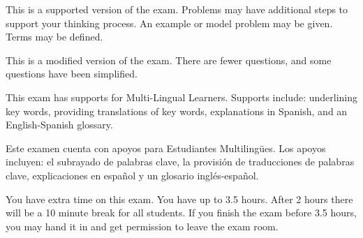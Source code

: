 \documentclass[12pt]{exam}
\begin{document}
\begin{coverpages}
{}{
    This is a supported version of the exam. Problems may have additional steps to support your thinking process. An example or model problem may be given. Terms may be defined. 
    
        \ifESP{ %
            \textcolor{blue!80!black}{
            Esta es una versión del examen con apoyos. Los problemas pueden tener pasos adicionales para apoyar su proceso de pensamiento. Se puede proporcionar un ejemplo o un problema modelo. Los términos pueden estar definidos.
            }
        }{}
}{
    This is a modified version of the exam. There are fewer questions, and some questions have been simplified.
}{
    This exam has supports for Multi-Lingual Learners. Supports include: underlining key words, providing translations of key words, explanations in Spanish, and an English-Spanish glossary. 
    
    \textcolor{blue!80!black}{Este examen cuenta con apoyos para Estudiantes Multilingües. Los apoyos incluyen: el subrayado de palabras clave, la provisión de traducciones de palabras clave, explicaciones en español y un glosario inglés-español.}
}{
    You have extra time on this exam. You have up to 3.5 hours. After 2 hours there will be a 10 minute break for all students. If you finish the exam before 3.5 hours, you may hand it in and get permission to leave the exam room. 
} %


\pledgeBox

\newpage

\end{coverpages}
\end{document}
